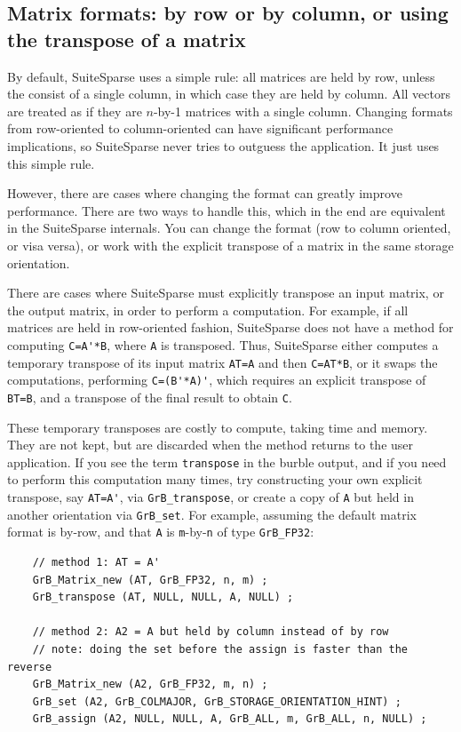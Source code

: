 \subsection{Matrix formats: by row or by column, or using the transpose of
a matrix}

By default, SuiteSparse uses a simple rule:
all matrices are held by row, unless the consist of a single
column, in which case they are held by column.  All vectors are treated as if
they are $n$-by-1 matrices with a single column.  Changing formats from
row-oriented to column-oriented can have significant performance implications,
so SuiteSparse never tries to outguess the application.  It just uses this
simple rule.

However, there are cases where changing the format can greatly improve
performance.  There are two ways to handle this, which in the end are
equivalent in the SuiteSparse internals.  You can change the format (row to
column oriented, or visa versa), or work with the explicit transpose of a
matrix in the same storage orientation.

There are cases where SuiteSparse must explicitly transpose an input matrix, or
the output matrix, in order to perform a computation.  For example, if all
matrices are held in row-oriented fashion, SuiteSparse does not have a method
for computing \verb"C=A'*B", where \verb'A' is transposed.  Thus, SuiteSparse
either computes a temporary transpose of its input matrix \verb'AT=A' and then
\verb'C=AT*B', or it swaps the computations, performing \verb"C=(B'*A)'", which
requires an explicit transpose of \verb'BT=B', and a transpose of the final
result to obtain \verb'C'.

These temporary transposes are costly to compute, taking time and memory.  They
are not kept, but are discarded when the method returns to the user
application.  If you see the term \verb'transpose' in the burble output, and if
you need to perform this computation many times, try constructing your own
explicit transpose, say \verb"AT=A'", via \verb'GrB_transpose', or create a
copy of \verb'A' but held in another orientation via \verb'GrB_set'.  For
example, assuming the default matrix format is by-row, and that \verb'A' is
\verb'm'-by-\verb'n' of type \verb'GrB_FP32':

    {\footnotesize
    \begin{verbatim}
    // method 1: AT = A'
    GrB_Matrix_new (AT, GrB_FP32, n, m) ;
    GrB_transpose (AT, NULL, NULL, A, NULL) ;

    // method 2: A2 = A but held by column instead of by row
    // note: doing the set before the assign is faster than the reverse
    GrB_Matrix_new (A2, GrB_FP32, m, n) ;
    GrB_set (A2, GrB_COLMAJOR, GrB_STORAGE_ORIENTATION_HINT) ;
    GrB_assign (A2, NULL, NULL, A, GrB_ALL, m, GrB_ALL, n, NULL) ; \end{verbatim}}

